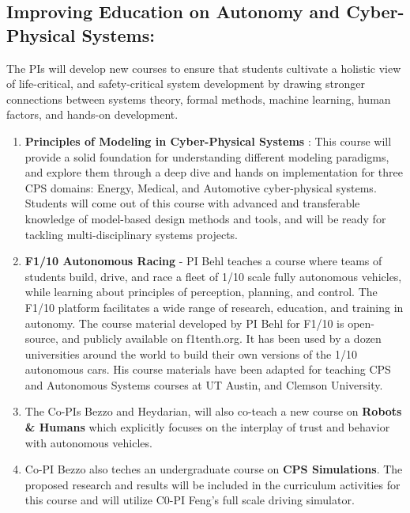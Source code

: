 \subsection{Improving Education on Autonomy and Cyber-Physical Systems:}
The PIs will develop new courses to ensure that students cultivate a holistic view of life-critical, and safety-critical system development by drawing stronger connections between systems theory, formal methods, machine learning, human factors, and hands-on development.
\begin{enumerate}[itemsep=0pt,parsep=0pt,topsep=4pt,leftmargin=0.4in]
    \item \textbf{Principles of Modeling in Cyber-Physical Systems} : This course will provide a solid foundation for understanding different modeling paradigms, and explore them through a deep dive and hands on implementation for three CPS domains: Energy, Medical, and Automotive cyber-physical systems. Students will come out of this course with advanced and transferable knowledge of model-based design methods and tools, and will be ready for tackling multi-disciplinary systems projects. 
    \item \textbf{F1/10 Autonomous Racing} - PI Behl teaches a course where teams of students build, drive, and race a fleet of 1/10 scale fully autonomous vehicles, while learning about principles of perception, planning, and control. The F1/10 platform facilitates a wide range of research, education, and training in autonomy. The course material developed by PI Behl for F1/10 is open-source, and publicly available on f1tenth.org. It has been used by a dozen universities around the world to build their own versions of the 1/10 autonomous cars. His course materials have been adapted for teaching CPS and Autonomous Systems courses at UT Austin, and Clemson University.
    \item The Co-PIs Bezzo and Heydarian, will also co-teach a new course on \textbf{Robots \& Humans} which explicitly focuses on the interplay of trust and behavior with autonomous vehicles.
    \item Co-PI Bezzo also teches an undergraduate course on \textbf{CPS Simulations}. The proposed research and results will be included in the curriculum activities for this course and will utilize C0-PI Feng's full scale driving simulator.
\end{enumerate}
